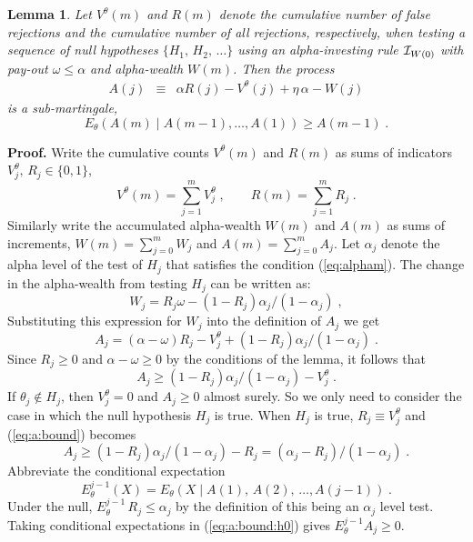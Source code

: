 \documentclass[12pt]{article}
\newtheorem{lemma}{Lemma}
\newcommand{\al}{\alpha}
\newcommand{\eqn}[1]{(\ref{#1})}
\newcommand{\given}{\; \big| \;}
\newcommand{\QED}{\frame{\rule{0pt}{6pt}\rule{6pt}{0pt}}}
\begin{document}
\begin{lemma} \label{le:martingale} Let $V^\theta(m)$ and $R(m)$
 denote the cumulative number of false rejections and the cumulative
 number of all rejections, respectively, when testing a sequence of
 null hypotheses $\{H_1,\,H_2,\,\ldots\}$ using an alpha-investing
 rule ${\cal I}_{W(0)}$ with pay-out $\omega \le \alpha$ and
 alpha-wealth $W(m)$.  Then the process
\begin{eqnarray*}
    A(j) 
  &\equiv& \alpha R(j) - V^\theta(j) + \eta \, \alpha  - W(j) 
\end{eqnarray*}
is a sub-martingale,
\begin{equation}
   E_\theta \left(A(m) \given A(m-1), \ldots, A(1)\right) \ge A(m-1) \;.
 \label{eq:super}
\end{equation}
\end{lemma}

\noindent 
{\bf Proof.} 
Write the cumulative counts $V^\theta(m)$ and $R(m)$ as sums of
indicators $V^\theta_j,\, R_j \in \{0,1\}$,
\begin{displaymath}
   V^\theta(m) = \sum_{j=1}^m V^\theta_j \;, \qquad
   R(m) = \sum_{j=1}^m R_j \;.
\label{eq:sums}
\end{displaymath}
Similarly write the accumulated alpha-wealth $W(m)$ and $A(m)$ as sums of
increments, $W(m) = \sum_{j=0}^m W_j$ and $A(m) = \sum_{j=0}^m A_j$.
Let $\alpha_j$ denote the alpha level of the test of $H_j$ that satisfies
the condition \eqn{eq:alpham}.  The change in the alpha-wealth from
testing $H_j$ can be written as:
\begin{displaymath}
  W_j  =  R_j \omega - (1-R_j) \al_j/(1-\al_j)  \;,
\end{displaymath}
Substituting this expression for $W_j$ into the definition of $A_j$ we get
\begin{displaymath}
   A_j  =  (\alpha -\omega) R_j - V^\theta_j  + (1-R_j) \al_j/(1-\al_j) \;.
\end{displaymath}
Since $R_j \ge 0$ and $\alpha - \omega \ge 0$ by the conditions of the
lemma, it follows that
\begin{equation}
\label{eq:a:bound}
A_j  \ge  (1-R_j)\al_j/(1-\al_j) - V^\theta_j   \;.
\end{equation}
If $\theta_j \not\in H_j$, then $V^\theta_j = 0$ and $A_j \ge 0$
almost surely.  So we only need to consider the case in which the null
hypothesis $H_j$ is true. When $H_j$ is true,  $R_j \equiv V_j^\theta$ and 
\eqn{eq:a:bound} becomes
\begin{equation}
\label{eq:a:bound:h0}
A_j  \ge  (1-R_j)\al_j/(1-\al_j) - R_j = (\al_j-R_j)/(1-\al_j)  \;.
\end{equation}
 Abbreviate the conditional expectation
\begin{displaymath}
  E_\theta^{j-1}(X) 
     = E_\theta \left(X \given  A(1),\,A(2),\,\ldots,A(j-1) \right)\;.
\end{displaymath}
Under the null,  $E_\theta^{j-1}\,R_j \le \alpha_j$ by the definition of
this being an $\alpha_j$ level test. Taking conditional expectations in  
\eqn{eq:a:bound:h0} gives $E_\theta^{j-1} A_j  \ge   0$.

\hfill \QED




\end{document}
